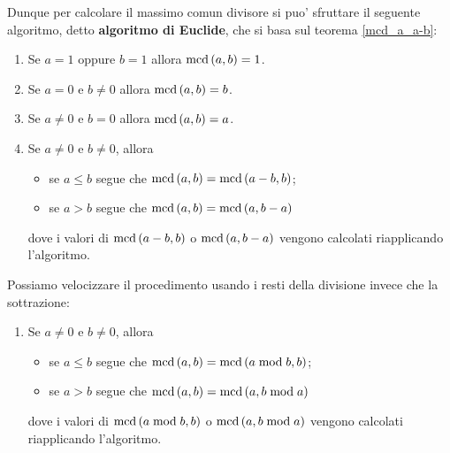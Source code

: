 Dunque per calcolare il massimo comun divisore si puo' sfruttare il seguente algoritmo, detto \textbf{algoritmo di Euclide}, che si basa sul teorema \ref{mcd_a_a-b}:
\begin{enumerate}
    \item Se $a = 1$ oppure $b = 1$ allora $\operatorname{mcd}\left(a, b\right) = 1$.
    \item Se $a = 0$ e $b \neq 0$ allora $\operatorname{mcd}\left(a, b\right) = b$.
    \item Se $a \neq 0$ e $b = 0$ allora $\operatorname{mcd}\left(a, b\right) = a$.
    \item Se $a \neq 0$ e $b \neq 0$, allora
        \begin{itemize}
            \item se $a \leq b$ segue che $\operatorname{mcd}\left(a, b\right) = \operatorname{mcd}\left(a - b, b\right)$;
            \item se $a > b$ segue che $\operatorname{mcd}\left(a, b\right) = \operatorname{mcd}\left(a, b - a\right)$
        \end{itemize}
        dove i valori di $\operatorname{mcd}\left(a - b, b\right)$ o $\operatorname{mcd}\left(a, b - a\right)$ vengono calcolati riapplicando l'algoritmo.
\end{enumerate}
Possiamo velocizzare il procedimento usando i resti della divisione invece che la sottrazione:
\begin{enumerate}[4.]
    \item Se $a \neq 0$ e $b \neq 0$, allora
    \begin{itemize}
        \item se $a \leq b$ segue che $\operatorname{mcd}\left(a, b\right) = \operatorname{mcd}\left(a \bmod b, b\right)$;
        \item se $a > b$ segue che $\operatorname{mcd}\left(a, b\right) = \operatorname{mcd}\left(a, b \bmod a\right)$
    \end{itemize}
    dove i valori di $\operatorname{mcd}\left(a \bmod b, b\right)$ o $\operatorname{mcd}\left(a, b \bmod a\right)$ vengono calcolati riapplicando l'algoritmo.
\end{enumerate}

